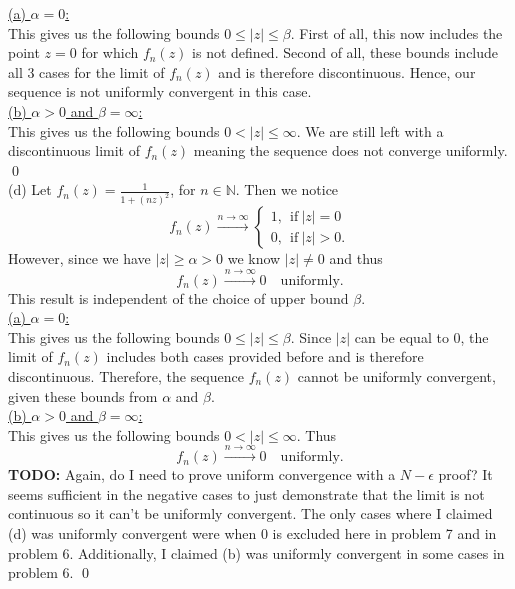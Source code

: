 \documentclass[10pt]{amsart}
\theoremstyle{nonumberplain}
\begin{document}
\begin{enumerate}[label={\bf {\arabic*}:}]
\underline{(a) $\alpha = 0$:} \\
This gives us the following bounds $0 \leq |z| \leq \beta$.
First of all, this now includes the point $z = 0$ for which $f_n(z)$ is not defined.
Second of all, these bounds include all 3 cases for the limit of $f_n(z)$ and is therefore discontinuous.
Hence, our sequence is not uniformly convergent in this case. \\

\underline{(b) $\alpha > 0$ and $\beta = \infty$:} \\
This gives us the following bounds $0 < |z| \leq \infty$.
We are still left with a discontinuous limit of $f_n(z)$ meaning the sequence does not converge uniformly. \\
\qed \\

\noindent
(d) Let $f_n(z) = \frac 1 {1 + (nz)^2}$, for $n \in \mathbb N$. Then we notice
$$
f_n(z) \overset{n \to \infty}{\longrightarrow} \begin{cases}
1, \: \: \text{if}\: |z| = 0 \\
0, \: \: \text{if}\: |z| > 0.
\end{cases}
$$
However, since we have $|z| \geq \alpha > 0$ we know $|z| \neq 0$ and thus
$$
f_n(z) \overset{n \to \infty}{\longrightarrow} 0 \quad \text{uniformly}.
$$
This result is independent of the choice of upper bound $\beta$. \\

\underline{(a) $\alpha = 0$:} \\
This gives us the following bounds $0 \leq |z| \leq \beta$.
Since $|z|$ can be equal to $0$, the limit of $f_n(z)$ includes both cases provided before and is therefore discontinuous.
Therefore, the sequence $f_n(z)$ cannot be uniformly convergent, given these bounds from $\alpha$ and $\beta$. \\

\underline{(b) $\alpha > 0$ and $\beta = \infty$:} \\
This gives us the following bounds $0 < |z| \leq \infty$.
Thus
$$
f_n(z) \overset{n \to \infty}{\longrightarrow} 0 \quad \text{uniformly}.
$$
\textbf{TODO:} Again, do I need to prove uniform convergence with a $N-\epsilon$ proof?
It seems sufficient in the negative cases to just demonstrate that the limit is not continuous so it can't be uniformly convergent.
The only cases where I claimed (d) was uniformly convergent were when 0 is excluded here in problem 7 and in problem 6.
Additionally, I claimed (b) was uniformly convergent in some cases in problem 6.
\qed \\


\end{enumerate}
\end{document}
